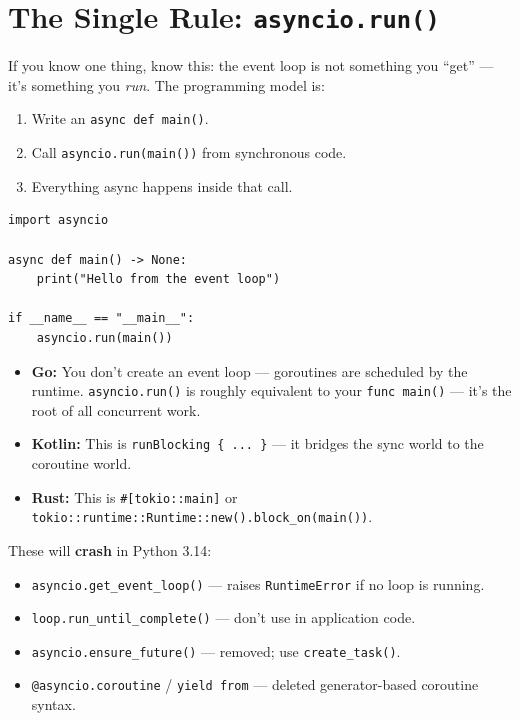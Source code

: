 \documentclass[11pt,a4paper,oneside]{book}
\newcommand{\py}[1]{\texttt{\color{pyblue}#1}}
\newcommand{\rustcode}[1]{\texttt{\color{BrickRed}#1}}
\newcommand{\javacode}[1]{\texttt{\color{javaorange!80!black}#1}}
\begin{document}
\section{The Single Rule: \py{asyncio.run()}}

If you know one thing, know this: the event loop is not something you ``get'' --- it's something
you \emph{run}. The programming model is:

\begin{enumerate}
    \item Write an \py{async def main()}.
    \item Call \py{asyncio.run(main())} from synchronous code.
    \item Everything async happens inside that call.
\end{enumerate}

\begin{lstlisting}[style=python]
import asyncio

async def main() -> None:
    print("Hello from the event loop")

if __name__ == "__main__":
    asyncio.run(main())
\end{lstlisting}

\begin{analogybox}
\begin{itemize}
    \item \textcolor{goblue}{\textbf{Go:}} You don't create an event loop --- goroutines are
          scheduled by the runtime. \py{asyncio.run()} is roughly equivalent to your \texttt{func main()}
          --- it's the root of all concurrent work.
    \item \textcolor{javaorange}{\textbf{Kotlin:}} This is \javacode{runBlocking \{ ... \}} ---
          it bridges the sync world to the coroutine world.
    \item \textcolor{BrickRed}{\textbf{Rust:}} This is \rustcode{\#[tokio::main]} or
          \texttt{tokio::runtime::Runtime::new().block\_on(main())}.
\end{itemize}
\end{analogybox}

\begin{dangerbox}[title={Removed patterns}]
These will \textbf{crash} in Python 3.14:
\begin{itemize}
    \item \py{asyncio.get\_event\_loop()} --- raises \py{RuntimeError} if no loop is running.
    \item \py{loop.run\_until\_complete()} --- don't use in application code.
    \item \py{asyncio.ensure\_future()} --- removed; use \py{create\_task()}.
    \item \py{@asyncio.coroutine} / \py{yield from} --- deleted generator-based coroutine syntax.
\end{itemize}
\end{dangerbox}
\end{document}
